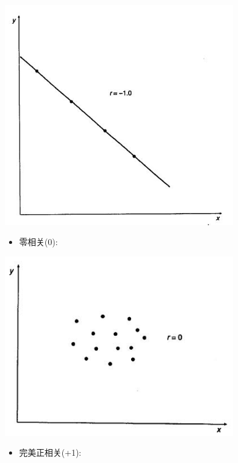 
\includegraphics[width=10cm]{maxwell_f67.jpg}

\begin{itemize}
\tightlist
\item
  零相关(0):
\end{itemize}


\includegraphics[width=10cm]{maxwell_f69.jpg}

\begin{itemize}
\tightlist
\item
  完美正相关(+1):
\end{itemize}


